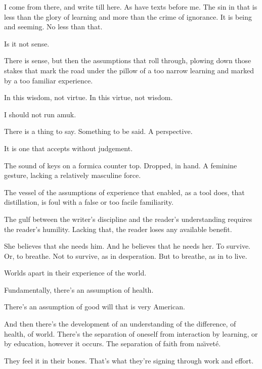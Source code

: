 I come from there, and write till here.  As have texts before me.  The
sin in that is less than the glory of learning and more than the crime
of ignorance.  It is being and seeming.  No less than that.

Is it not sense.  

There is sense, but then the assumptions that roll through, plowing
down those stakes that mark the road under the pillow of a too narrow
learning and marked by a too familiar experience.

In this wisdom, not virtue.  In this virtue, not wisdom.

I should not run amuk.

There is a thing to say.  Something to be said.  A perspective.

It is one that accepts without judgement.

\vfill
\break


The sound of keys on a formica counter top. \break Dropped, in hand.
A feminine gesture, lacking a relatively masculine force.


The vessel of the assumptions of experience that enabled, as a tool
does, that distillation, is foul with a false or too facile
familiarity.

\vfill
\break


The gulf between the writer's discipline and the \break reader's
understanding requires the reader's humility. \break Lacking that, the
reader loses any available benefit.

\vfill
\break


She believes that she needs him.  And he believes that he needs her.
To survive.  Or, to breathe.  Not to survive, as in desperation.  But
to breathe, as in to live.

\vfill
\break


Worlds apart in their experience of the world.

Fundamentally, there's an assumption of health.  

There's an assumption of good will that is very \break American.

And then there's the development of an \break understanding of the
difference, of health, of world.  \break There's the separation of
oneself from interaction by learning, or by education, however it
occurs.  The separation of faith from na\"{\i}vet\'{e}.

They feel it in their bones.  That's what they're signing through work
and effort.


\vfill
\break


